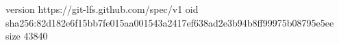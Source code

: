 version https://git-lfs.github.com/spec/v1
oid sha256:82d182e6f15bb7fe015aa001543a2417ef638ad2e3b94b8ff99975b08795e5ee
size 43840
